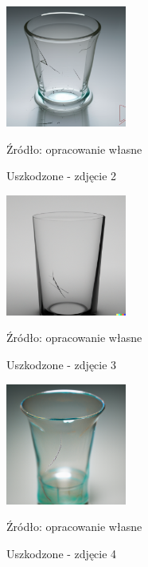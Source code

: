 \begin{figure}[htbp]
  \centering
  \caption{Uszkodzone - zdjęcie 2}
  \includegraphics[width=150px]{images/failure_2.png}
  \begin{center}
  \footnotesize{Źródło: opracowanie własne}
  \end{center}
  \label{fig:zdjecie_uszkodzone_2}
\end{figure}

\begin{figure}[htbp]
  \centering
  \caption{Uszkodzone - zdjęcie 3}
  \includegraphics[width=150px]{images/failure_3.png}
  \begin{center}
  \footnotesize{Źródło: opracowanie własne}
  \end{center}
  \label{fig:zdjecie_uszkodzone_3}
\end{figure}

\begin{figure}[htbp]
  \centering
  \caption{Uszkodzone - zdjęcie 4}
  \includegraphics[width=150px]{images/failure_4.png}
  \begin{center}
  \footnotesize{Źródło: opracowanie własne}
  \end{center}
  \label{fig:zdjecie_uszkodzone_4}
\end{figure}

